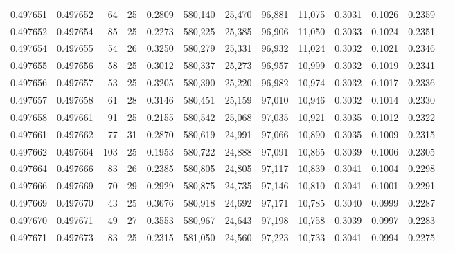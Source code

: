 \begin{tabular}{rrrrrrrrrrrrr}
0.497651 & 0.497652 &  64 &  25 &                                     0.2809 & 580,140 &  25,470 &  96,881 &  11,075 & 0.3031 & 0.1026 & 0.2359 \\
0.497652 & 0.497654 &  85 &  25 &                                     0.2273 & 580,225 &  25,385 &  96,906 &  11,050 & 0.3033 & 0.1024 & 0.2351 \\
0.497654 & 0.497655 &  54 &  26 &                                     0.3250 & 580,279 &  25,331 &  96,932 &  11,024 & 0.3032 & 0.1021 & 0.2346 \\
0.497655 & 0.497656 &  58 &  25 &                                     0.3012 & 580,337 &  25,273 &  96,957 &  10,999 & 0.3032 & 0.1019 & 0.2341 \\
0.497656 & 0.497657 &  53 &  25 &                                     0.3205 & 580,390 &  25,220 &  96,982 &  10,974 & 0.3032 & 0.1017 & 0.2336 \\
0.497657 & 0.497658 &  61 &  28 &                                     0.3146 & 580,451 &  25,159 &  97,010 &  10,946 & 0.3032 & 0.1014 & 0.2330 \\
0.497658 & 0.497661 &  91 &  25 &                                     0.2155 & 580,542 &  25,068 &  97,035 &  10,921 & 0.3035 & 0.1012 & 0.2322 \\
0.497661 & 0.497662 &  77 &  31 &                                     0.2870 & 580,619 &  24,991 &  97,066 &  10,890 & 0.3035 & 0.1009 & 0.2315 \\
0.497662 & 0.497664 & 103 &  25 &                                     0.1953 & 580,722 &  24,888 &  97,091 &  10,865 & 0.3039 & 0.1006 & 0.2305 \\
0.497664 & 0.497666 &  83 &  26 &                                     0.2385 & 580,805 &  24,805 &  97,117 &  10,839 & 0.3041 & 0.1004 & 0.2298 \\
0.497666 & 0.497669 &  70 &  29 &                                     0.2929 & 580,875 &  24,735 &  97,146 &  10,810 & 0.3041 & 0.1001 & 0.2291 \\
0.497669 & 0.497670 &  43 &  25 &                                     0.3676 & 580,918 &  24,692 &  97,171 &  10,785 & 0.3040 & 0.0999 & 0.2287 \\
0.497670 & 0.497671 &  49 &  27 &                                     0.3553 & 580,967 &  24,643 &  97,198 &  10,758 & 0.3039 & 0.0997 & 0.2283 \\
0.497671 & 0.497673 &  83 &  25 &                                     0.2315 & 581,050 &  24,560 &  97,223 &  10,733 & 0.3041 & 0.0994 & 0.2275 \\

\end{tabular}
